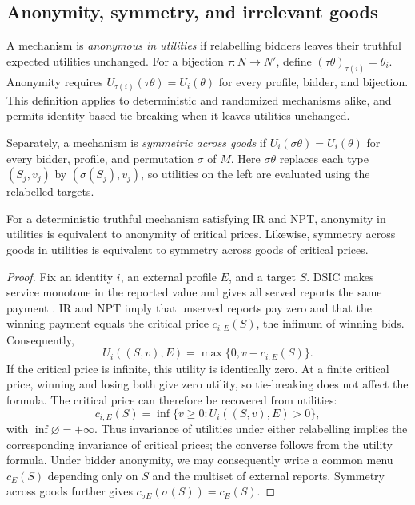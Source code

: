 \documentclass[format=acmsmall, review=false]{acmart}
\theoremstyle{acmdefinition}%
\begin{document}
\subsection{Anonymity, symmetry, and irrelevant goods}

A mechanism is \emph{anonymous in utilities} if relabelling
bidders leaves their truthful expected utilities unchanged.
For a bijection $\tau:N\to N'$, define
$(\tau\theta)_{\tau(i)}=\theta_i$. Anonymity requires
$U_{\tau(i)}(\tau\theta)=U_i(\theta)$ for every profile, bidder,
and bijection. This definition applies to deterministic and
randomized mechanisms alike, and permits identity-based
tie-breaking when it leaves utilities unchanged.

Separately, a mechanism is \emph{symmetric across goods} if
$U_i(\sigma\theta)=U_i(\theta)$ for every bidder, profile, and
permutation $\sigma$ of $M$. Here $\sigma\theta$ replaces each
type $(S_j,v_j)$ by $(\sigma(S_j),v_j)$, so utilities on the
left are evaluated using the relabelled targets.

\begin{lemma}
\label{lem:utility-symmetry}
For a deterministic truthful mechanism satisfying IR and NPT,
anonymity in utilities is equivalent to anonymity of critical
prices. Likewise, symmetry across goods in utilities is
equivalent to symmetry across goods of critical prices.
\end{lemma}

\begin{proof}
Fix an identity $i$, an external profile $E$, and a target $S$.
DSIC makes service monotone in the reported value and gives
all served reports the same payment
\citep{lehmann2002truth,mualem2008truthful}. IR and NPT imply that
unserved reports pay zero and that the winning payment equals
the critical price $c_{i,E}(S)$, the infimum of winning bids.
Consequently,
\[
U_i((S,v),E)=\max\{0,v-c_{i,E}(S)\}.
\]
If the critical price is infinite, this utility is identically
zero. At a finite critical price, winning and losing both give
zero utility, so tie-breaking does not affect the formula.
The critical price can therefore be recovered from utilities:
\[
c_{i,E}(S)
=\inf\{v\ge0:U_i((S,v),E)>0\},
\]
with $\inf\varnothing=+\infty$. Thus invariance of utilities
under either relabelling implies the corresponding invariance
of critical prices; the converse follows from the utility
formula. Under bidder anonymity, we may consequently write a
common menu $c_E(S)$ depending only on $S$ and the multiset
of external reports. Symmetry across goods further gives
$c_{\sigma E}(\sigma(S))=c_E(S)$.
\end{proof}
\end{document}

